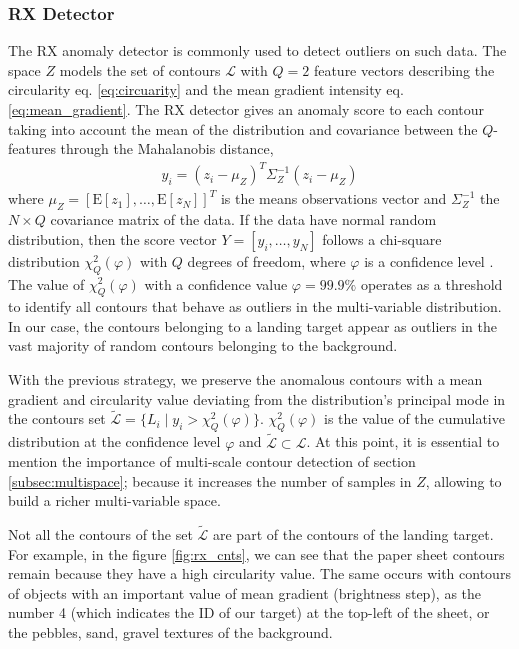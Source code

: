 \subsubsection{RX Detector}\label{subsec:rx_detector}
The RX anomaly detector \citep{Reed.Yu:TASSP:1990} is commonly used to detect outliers on such data. The space $Z$ models the set of contours $\mathcal{L}$ with $Q=2$ feature vectors describing the circularity eq. \eqref{eq:circuarity} and the mean gradient intensity eq. \eqref{eq:mean_gradient}. The RX detector gives an anomaly score to each contour taking into account the mean of the distribution and covariance between the $Q$-features through the Mahalanobis distance,
\begin{eqnarray}\label{eq:RX_detector}
y_{i}= (z_{i}-\mu_{Z})^{T}\Sigma^{-1}_{Z}(z_{i}-\mu_{Z})
\end{eqnarray}
where $\mu_{Z}=[\mathrm{E}[z_{1}], \ldots, \mathrm{E}[z_{N}]]^T$ is the means observations vector and $\Sigma^{-1}_{Z}$ the $N\times Q$ covariance matrix of the data. If the data have normal random distribution, then the score vector $Y=[y_{i}, \ldots, y_{N}]$ follows a chi-square distribution $\chi^{2}_{Q}(\varphi)$ with $Q$ degrees of freedom, where $\varphi$ is a confidence level \citep{Lu.Chen.ea:IJAIT:2004}. The value of $\chi^{2}_{Q}(\varphi)$ with a confidence value $\varphi=99.9\%$ operates as a threshold to identify all contours that behave as outliers in the multi-variable distribution. In our case, the contours belonging to a landing target appear as outliers in the vast majority of random contours belonging to the background.

With the previous strategy, we preserve the anomalous contours with a mean gradient and circularity value deviating from the distribution's principal mode in the contours set $\widetilde{\mathcal{L}}=\{L_{i}\mid y_{i}>\chi^{2}_{Q}(\varphi)\}$. $\chi^{2}_{Q}(\varphi)$ is the value of the cumulative distribution at the confidence level $\varphi$ and $\widetilde{\mathcal{L}} \subset \mathcal{L}$. At this point, it is essential to mention the importance of multi-scale contour detection of section \ref{subsec:multispace}; because it increases the number of samples in $Z$, allowing to build a richer multi-variable space.

Not all the contours of the set $\widetilde{\mathcal{L}}$ are part of the contours of the landing target. For example, in the figure \ref{fig:rx_cnts}, we can see that the paper sheet contours remain because they have a high circularity value. The same occurs with contours of objects with an important value of mean gradient (brightness step), as the number 4 (which indicates the ID of our target) at the top-left of the sheet, or the pebbles, sand, gravel textures of the background.

